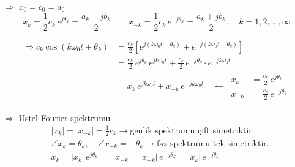 \documentclass[11pt,a4paper]{article}
\begin{document}
$\Rightarrow$ $x_0 = c_0 = a_0$
\[ x_k = \frac{1}{2}c_k\,e^{j\theta_k} = \frac{a_k - j b_k}{2} \qquad x_{-k} = \frac{1}{2}c_k\,e^{-j\theta_k} = \frac{a_k + j b_k}{2}, \quad k = 1, 2, \ldots, \infty \]

\begin{align*}
  \Rightarrow c_k\cos(k\omega_0 t + \theta_k) &= \frac{c_k}{2}\left[e^{j(k\omega_0 t + \theta_k)} + e^{-j(k\omega_0 t + \theta_k)}\right] \\
  &= \frac{c_k}{2}\,e^{j\theta_k}\,e^{jk\omega_0 t} + \frac{c_k}{2}\,e^{-j\theta_k}\cdot e^{-jk\omega_0 t} \\
  &= x_k\,e^{jk\omega_0 t} + x_{-k}\,e^{-jk\omega_0 t} \quad \longleftarrow \ \begin{aligned} x_k &= \frac{c_k}{2}\,e^{j\theta_k} \\ x_{-k} &= \frac{c_k}{2}\,e^{-j\theta_k} \end{aligned}
\end{align*}

$\Rightarrow$ Üstel Fourier spektrumu
\begin{align*}
  & |x_k| = |x_{-k}| = \frac{1}{2}c_k \longrightarrow \text{genlik spektrumu çift simetriktir.} \\
  & \angle x_k = \theta_k, \quad \angle x_{-k} = -\theta_k \longrightarrow \text{faz spektrumu tek simetriktir.} \\
  & x_k = |x_k|\,e^{j\theta_k} \qquad x_{-k} = |x_{-k}|\,e^{-j\theta_k} = |x_k|\,e^{-j\theta_k}
\end{align*}
\end{document}
